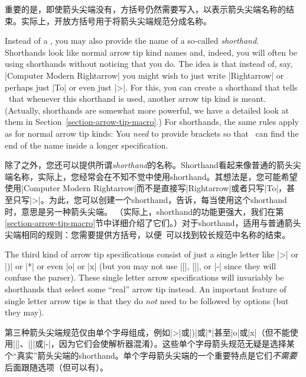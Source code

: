 重要的是，即使箭头尖端没有，方括号仍然需要写入，以表示箭头尖端名称的结束。实际上，开放方括号用于将箭头尖端规范分成名称。

Instead of a , you may also provide the name of a
so-called \emph{shorthand}. Shorthands look like normal arrow tip kind names
and, indeed, you will often be using shorthands without noticing that you do.
The idea is that instead of, say, |Computer Modern Rightarrow| you might wish
to just write |Rightarrow| or perhaps just |To| or even just |>|. For this, you
can create a shorthand that tells \tikzname\ that whenever this shorthand is
used, another arrow tip kind is meant. (Actually, shorthands are somewhat more
powerful, we have a detailed look at them in
Section~\ref{section-arrow-tip-macro}.) For shorthands, the same rules apply as
for normal arrow tip kinds: You \emph{need} to provide brackets so that
\tikzname\ can find the end of the name inside a longer specification.

除了之外，您还可以提供所谓\emph{shorthand}的名称。Shorthand看起来像普通的箭头尖端名称，实际上，您经常会在不知不觉中使用shorthand。其想法是，您可能希望使用|Computer Modern Rightarrow|而不是直接写|Rightarrow|或者只写|To|，甚至只写|>|。为此，您可以创建一个shorthand，告诉\tikzname，每当使用这个shorthand时，意思是另一种箭头尖端。 （实际上，shorthand的功能更强大，我们在第\ref{section-arrow-tip-macro}节中详细介绍了它们。）对于shorthand，适用与普通箭头尖端相同的规则：您需要提供方括号，以便\tikzname\ 可以找到较长规范中名称的结束。

The third kind of arrow tip specifications consist of just a single letter like
|>| or |)| or |*| or even |o| or |x| (but you may not use |[|, |]|, or |-|
since they will confuse the parser). These single letter arrow specifications
will invariably be shorthands that select some ``real'' arrow tip instead. An
important feature of single letter arrow tips is that they do \emph{not} need
to be followed by options (but they may).

第三种箭头尖端规范仅由单个字母组成，例如|>|或|)|或|*|甚至|o|或|x|（但不能使用|[|、|]|或|-|，因为它们会使解析器混淆）。这些单个字母箭头规范无疑是选择某个“真实”箭头尖端的shorthand。单个字母箭头尖端的一个重要特点是它们\emph{不需要}后面跟随选项（但可以有）。

